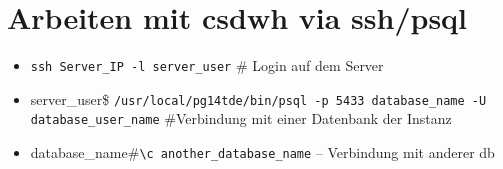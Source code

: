    \section{Arbeiten mit \acs{csdwh} via ssh/psql}
   
   \begin{itemize}
   	\item \texttt{ssh Server\_IP -l server\_user} \# Login auf dem Server
   	\item server\_user\$ \texttt{/usr/local/pg14tde/bin/psql -p 5433 database\_name -U database\_user\_name} \#Verbindung mit einer Datenbank der Instanz 
   	\item database\_name\#\texttt{\textbackslash c another\_database\_name} -- Verbindung mit anderer \ac{db}
   \end{itemize}
